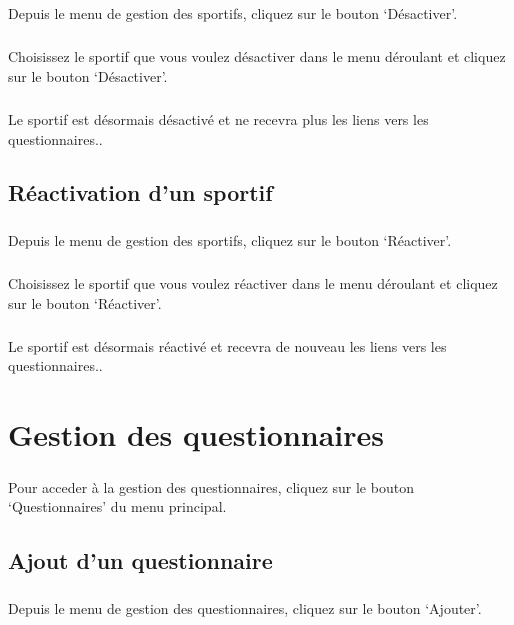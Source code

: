 \documentclass[french,12pt,a4paper,openany]{book}
\begin{document}
			\paragraph{}{Depuis le menu de gestion des sportifs, cliquez sur le bouton `Désactiver'.}
			\paragraph{}{Choisissez le sportif que vous voulez désactiver dans le menu déroulant et cliquez sur le bouton `Désactiver'.}
			\paragraph{}{Le sportif est désormais désactivé et ne recevra plus les liens vers les questionnaires.}.
		\section{Réactivation d'un sportif}
			\paragraph{}{Depuis le menu de gestion des sportifs, cliquez sur le bouton `Réactiver'.}
			\paragraph{}{Choisissez le sportif que vous voulez réactiver dans le menu déroulant et cliquez sur le bouton `Réactiver'.}
			\paragraph{}{Le sportif est désormais réactivé et recevra de nouveau les liens vers les questionnaires.}.
	\chapter{Gestion des questionnaires}
		\paragraph{}{Pour acceder à la gestion des questionnaires, cliquez sur le bouton `Questionnaires' du menu principal.}
		\section{Ajout d'un questionnaire}
			\paragraph{}{Depuis le menu de gestion des questionnaires, cliquez sur le bouton `Ajouter'.}
\end{document}
